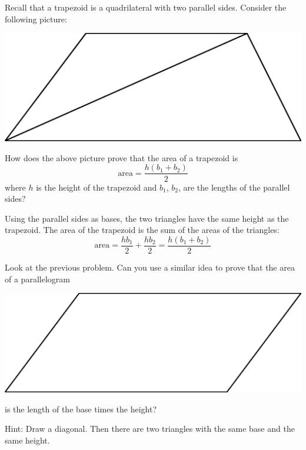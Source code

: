 \documentclass[nooutcomes]{ximera}
\begin{document}
\begin{problem}
Recall that a trapezoid is a quadrilateral with two parallel sides. Consider the following picture:
\begin{image}
\includegraphics{trap.png}
\end{image}
How does the above picture prove that the area of a trapezoid is
\[
\mathrm{area} = \frac{h(b_1 + b_2)}{2}
\]
where $h$ is the height of the trapezoid and $b_1$, $b_2$, are the lengths of the parallel sides?
\begin{freeResponse}
\begin{hint}
Using the parallel sides as bases, the two triangles have the same height as the trapezoid.  The area of the trapezoid is the sum of the areas of the triangles: 
\[
\mathrm{area} =  \frac{hb_1}{2}+ \frac{hb_2}{2}= \frac{h(b_1 + b_2)}{2}
\]
\end{hint}
\end{freeResponse}
\end{problem}


\begin{problem}
Look at the previous problem. Can you use a similar idea
  to prove that the area of a parallelogram
\begin{image}
\includegraphics{para.png}
\end{image}
is the length of the base times the height?
\begin{freeResponse}
\begin{hint}
Hint:  Draw a diagonal.  Then there are two triangles with the same base and the same height.  
\end{hint}
\end{freeResponse}
\end{problem}
\end{document}
